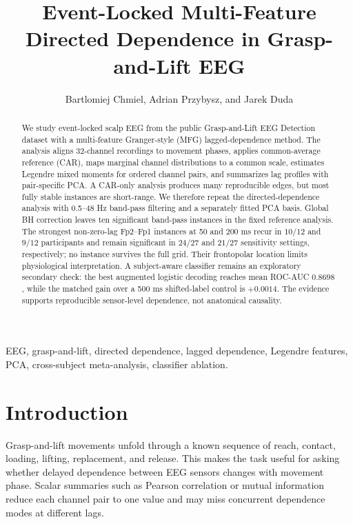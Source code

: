 \documentclass[10pt,journal]{IEEEtran}
\title{Event-Locked Multi-Feature Directed Dependence in Grasp-and-Lift EEG}
\author{Bartlomiej Chmiel, Adrian Przybysz, and Jarek Duda}
\begin{document}
\maketitle

\begin{abstract}
    We study event-locked scalp EEG from the public Grasp-and-Lift EEG Detection dataset with a multi-feature Granger-style (MFG) lagged-dependence method. The analysis aligns 32-channel recordings to movement phases, applies common-average reference (CAR), maps marginal channel distributions to a common scale, estimates Legendre mixed moments for ordered channel pairs, and summarizes lag profiles with pair-specific PCA. A CAR-only analysis produces many reproducible edges, but most fully stable instances are short-range. We therefore repeat the directed-dependence analysis with 0.5--48 Hz band-pass filtering and a separately fitted PCA basis. Global BH correction leaves ten significant band-pass instances in the fixed reference analysis. The strongest non-zero-lag Fp2--Fp1 instances at 50 and 200 ms recur in $10/12$ and $9/12$ participants and remain significant in $24/27$ and $21/27$ sensitivity settings, respectively; no instance survives the full grid. Their frontopolar location limits physiological interpretation. A subject-aware classifier remains an exploratory secondary check: the best augmented logistic decoding reaches mean ROC-AUC $0.8698$, while the matched gain over a 500 ms shifted-label control is $+0.0014$. The evidence supports reproducible sensor-level dependence, not anatomical causality.
\end{abstract}

\begin{IEEEkeywords}
    EEG, grasp-and-lift, directed dependence, lagged dependence, Legendre features, PCA, cross-subject meta-analysis, classifier ablation.
\end{IEEEkeywords}

\section{Introduction}
Grasp-and-lift movements unfold through a known sequence of reach, contact, loading, lifting, replacement, and release. This makes the task useful for asking whether delayed dependence between EEG sensors changes with movement phase. Scalar summaries such as Pearson correlation or mutual information reduce each channel pair to one value and may miss concurrent dependence modes at different lags.
\end{document}
